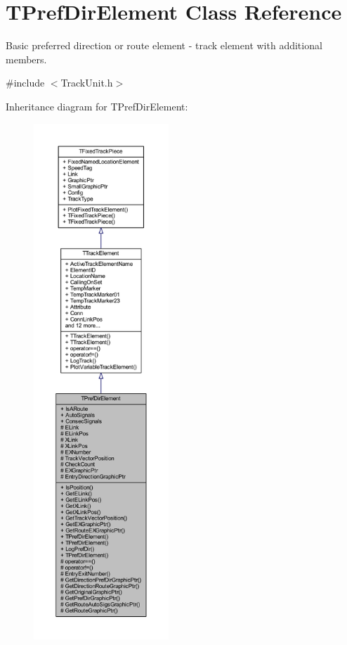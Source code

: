 \hypertarget{class_t_pref_dir_element}{}\section{T\+Pref\+Dir\+Element Class Reference}
\label{class_t_pref_dir_element}


Basic preferred direction or route element -\/ track element with additional members.  




{\ttfamily \#include $<$Track\+Unit.\+h$>$}



Inheritance diagram for T\+Pref\+Dir\+Element\+:
\nopagebreak
\begin{figure}[H]
\begin{center}
\leavevmode
\includegraphics[height=550pt]{class_t_pref_dir_element__inherit__graph}
\end{center}
\end{figure}


